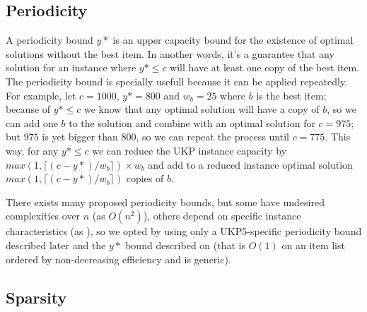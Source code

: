 \documentclass[runningheads,a4paper]{llncs}
\begin{document}


\subsection{Periodicity}

A periodicity bound \(y*\) is an upper capacity bound for the existence of optimal solutions without the best item. In another words, it's a guarantee that any solution for an instance where \(y* \leq c\) will have at least one copy of the best item. The periodicity bound is specially usefull because it can be applied repeatedly. For example, let \(c = 1000\), \(y* = 800\) and \(w_b = 25\) where \(b\) is the best item; because of \(y* \leq c\) we know that any optimal solution will have a copy of \(b\), so we can add one \(b\) to the solution and combine with an optimal solution for \(c = 975\); but \(975\) is yet bigger than \(800\), so we can repeat the process until \(c = 775\). This way, for any \(y* \leq c\) we can reduce the UKP instance capacity by \(max(1, \lceil(c-y*)/w_b\rceil)\times w_b\) and add to a reduced instance optimal solution \(max(1, \lceil(c-y*)/w_b\rceil)\) copies of \(b\).

There exists many proposed periodicity bounds, but some have undesired complexities over \(n\) (as \(O(n^2)\)\cite{CBADBOUND}), others depend on specific instance characteristics (as \cite{BADBOUND2}\cite{CPYA}), so we opted by using only a UKP5-specific periodicity bound described later and the \(y*\) bound described on \cite[p. 223]{gar72} (that is \(O(1)\) on an item list ordered by non-decreasing efficiency and is generic).

\subsection{Sparsity}

\end{document}
